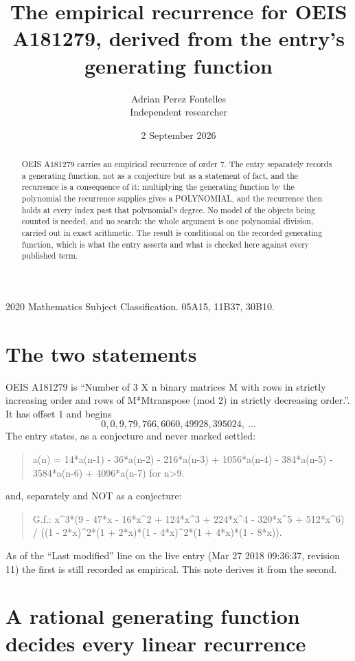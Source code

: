 \documentclass[11pt,a4paper]{article}
\title{The empirical recurrence for OEIS A181279, derived from the entry's generating function}
\author{Adrian Perez Fontelles\\ \small Independent researcher}
\date{2 September 2026}
\theoremstyle{plain}
\theoremstyle{definition}
\begin{document}
\maketitle

\begin{abstract}
OEIS A181279 carries an empirical recurrence of order $7$. The entry separately records a
generating function, not as a conjecture but as a statement of fact, and the recurrence is a
consequence of it: multiplying the generating function by the polynomial the recurrence
supplies gives a POLYNOMIAL, and the recurrence then holds at every index past that
polynomial's degree. No model of the objects being counted is needed, and no search: the
whole argument is one polynomial division, carried out in exact arithmetic. The result is
conditional on the recorded generating function, which is what the entry asserts and what is
checked here against every published term.
\end{abstract}

\noindent\small 2020 Mathematics Subject Classification. 05A15, 11B37, 30B10.\normalsize

\section{The two statements}

OEIS A181279 is ``Number of 3 X n binary matrices M with rows in strictly increasing order and rows of M*Mtranspose (mod 2) in strictly decreasing order.''. It has offset $1$ and begins
\[
0, 0, 9, 79, 766, 6060, 49928, 395024,\ \dots
\]
The entry states, as a conjecture and never marked settled:
\begin{quote}
a(n) = 14*a(n-1) - 36*a(n-2) - 216*a(n-3) + 1056*a(n-4) - 384*a(n-5) - 3584*a(n-6) + 4096*a(n-7) for n>9.
\end{quote}
and, separately and NOT as a conjecture:
\begin{quote}
G.f.: x\^{}3*(9 - 47*x - 16*x\^{}2 + 124*x\^{}3 + 224*x\^{}4 - 320*x\^{}5 + 512*x\^{}6) / ((1 - 2*x)\^{}2*(1 + 2*x)*(1 - 4*x)\^{}2*(1 + 4*x)*(1 - 8*x)).
\end{quote}
As of the ``Last modified'' line on the live entry (Mar 27 2018 09:36:37, revision 11) the first is still
recorded as empirical. This note derives it from the second.

\section{A rational generating function decides every linear recurrence}
\end{document}

